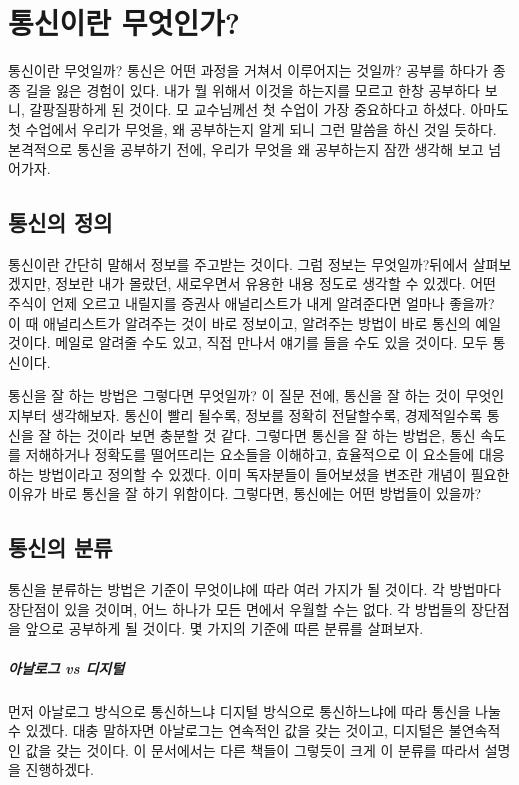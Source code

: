 \chapter{통신이란 무엇인가?}
통신이란 무엇일까? 통신은 어떤 과정을 거쳐서 이루어지는 것일까?
공부를 하다가 종종 길을 잃은 경험이 있다. 내가 뭘 위해서 이것을 하는지를 모르고 한창 공부하다 보니, 갈팡질팡하게 된 것이다.
모 교수님께선 첫 수업이 가장 중요하다고 하셨다. 아마도 첫 수업에서 우리가 무엇을, 왜 공부하는지 알게 되니 그런 말씀을 하신 것일 듯하다.
본격적으로 통신을 공부하기 전에, 우리가 무엇을 왜 공부하는지 잠깐 생각해 보고 넘어가자.

\section{통신의 정의}
통신이란 간단히 말해서 정보를 주고받는 것이다. 그럼 정보\label{정보}는 무엇일까?뒤에서 살펴보겠지만, 정보란 내가 몰랐던, 새로우면서 유용한 내용 정도로 생각할 수 있겠다.
어떤 주식이 언제 오르고 내릴지를 증권사 애널리스트가 내게 알려준다면 얼마나 좋을까?
이 때 애널리스트가 알려주는 것이 바로 정보이고, 알려주는 방법이 바로 통신의 예일 것이다. 메일로 알려줄 수도 있고, 직접 만나서 얘기를 들을 수도 있을 것이다. 모두 통신이다.
\par
통신을 잘 하는 방법은 그렇다면 무엇일까?
이 질문 전에, 통신을 잘 하는 것이 무엇인지부터 생각해보자.
통신이 빨리 될수록, 정보를 정확히 전달할수록, 경제적일수록 통신을 잘 하는 것이라 보면 충분할 것 같다.
그렇다면 통신을 잘 하는 방법은, 통신 속도를 저해하거나 정확도를 떨어뜨리는 요소들을 이해하고, 효율적으로 이 요소들에 대응하는 방법이라고 정의할 수 있겠다.
이미 독자분들이 들어보셨을 변조란 개념이 필요한 이유가 바로 통신을 잘 하기 위함이다.
그렇다면, 통신에는 어떤 방법들이 있을까?

\section{통신의 분류}
통신을 분류하는 방법은 기준이 무엇이냐에 따라 여러 가지가 될 것이다. 각 방법마다 장단점이 있을 것이며, 어느 하나가 모든 면에서 우월할 수는 없다. 각 방법들의 장단점을 앞으로 공부하게 될 것이다.
몇 가지의 기준에 따른 분류를 살펴보자.
\paragraph{아날로그 vs 디지털} 먼저 아날로그 방식으로 통신하느냐 디지털 방식으로 통신하느냐에 따라 통신을 나눌 수 있겠다.
대충 말하자면 아날로그는 연속적인 값을 갖는 것이고, 디지털은 불연속적인 값을 갖는 것이다.
이 문서에서는 다른 책들이 그렇듯이 크게 이 분류를 따라서 설명을 진행하겠다.

